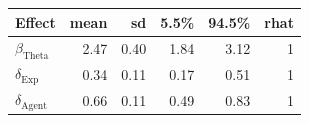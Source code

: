 
\begin{tabular}[t]{lrrrrr}
\toprule
Effect & mean & sd & 5.5\% & 94.5\% & rhat\\
\midrule
$\beta_{\text{Theta}}$ & 2.47 & 0.40 & 1.84 & 3.12 & 1\\
$\delta_{\text{Exp}}$ & 0.34 & 0.11 & 0.17 & 0.51 & 1\\
$\delta_{\text{Agent}}$ & 0.66 & 0.11 & 0.49 & 0.83 & 1\\
\bottomrule
\end{tabular}
